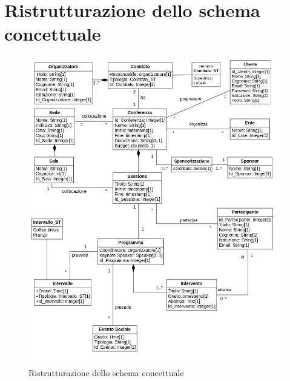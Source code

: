 \section{Ristrutturazione dello schema concettuale}
\begin{figure}[h!]
\centering
\includegraphics[scale=0.55]{Immagini/Schema_Concettuale_Ristrutturato.png}
\caption{Ristrutturazione dello schema concettuale}\label{uml:schema_ristrutturato}
\end{figure}
